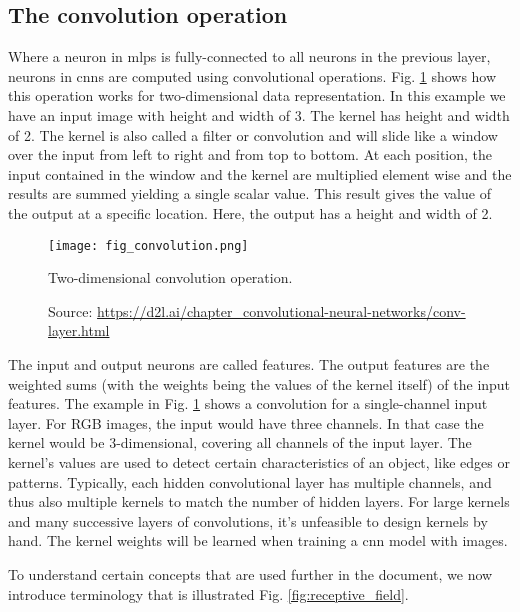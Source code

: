 \subsection{The convolution operation}
Where a neuron in \acrshort{mlp}s is fully-connected to all neurons in the previous layer, neurons in \acrshort{cnn}s are computed using convolutional operations. Fig. \ref{fig:convolution} shows how this operation works for two-dimensional data representation. In this example we have an input image with height and width of 3. The kernel has height and width of 2. The kernel is also called a filter or convolution and will slide like a window over the input from left to right and from top to bottom. At each position, the input contained in the window and the kernel are multiplied element wise and the results are summed yielding a single scalar value. This result gives the value of the output at a specific location. Here, the output has a height and width of 2.
\begin{figure}[ht]
    \begin{center}       
    \texttt{[image: fig\_convolution.png]}
    \caption[Two-dimensional convolution operation]{Two-dimensional convolution operation.}
    \caption*{Source: \href{https://d2l.ai/chapter\_convolutional-neural-networks/conv-layer.html}{https://d2l.ai/chapter\_convolutional-neural-networks/conv-layer.html}}
    \label{fig:convolution}
    \end{center}
\end{figure}

The input and output neurons are called features. The output features are the weighted sums (with the weights being the values of the kernel itself) of the input features. The example in Fig. \ref{fig:convolution} shows a convolution for a single-channel input layer. For RGB images, the input would have three channels. In that case the kernel would be 3-dimensional, covering all channels of the input layer. The kernel's values are used to detect certain characteristics of an object, like edges or patterns. Typically, each hidden convolutional layer has multiple channels, and thus also multiple kernels to match the number of hidden layers. For large kernels and many successive layers of convolutions, it's unfeasible to design kernels by hand. The kernel weights will be learned when training a \acrshort{cnn} model with images.

To understand certain concepts that are used further in the document, we now introduce terminology that is illustrated Fig. \ref{fig:receptive_field}.

